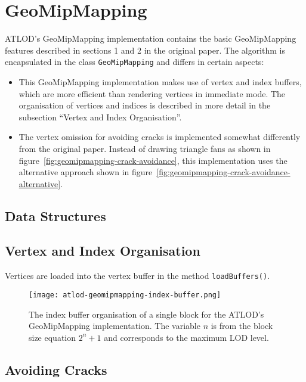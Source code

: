\section{GeoMipMapping}
ATLOD's GeoMipMapping implementation contains the basic GeoMipMapping features 
described in sections 1 and 2 in the original paper. 
The algorithm is encapsulated in the class \texttt{GeoMipMapping} and differs in certain aspects:
\begin{itemize}
  \item This GeoMipMapping implementation makes use of vertex and index buffers, which are more efficient than 
        rendering vertices in immediate mode. The organisation of vertices and indices is described in more detail in the subsection ``Vertex and Index Organisation''.
  \item The vertex omission for avoiding cracks is implemented somewhat differently from the original paper. 
        Instead of drawing triangle fans as shown in figure~\ref{fig:geomipmapping-crack-avoidance}, this implementation 
        uses the alternative approach shown in figure~\ref{fig:geomipmapping-crack-avoidance-alternative}.
\end{itemize}

\subsection{Data Structures}

\subsection{Vertex and Index Organisation}
Vertices are loaded into the vertex buffer in the method \texttt{loadBuffers()}. 

\begin{figure}[H]
  \centering
  \texttt{[image: atlod-geomipmapping-index-buffer.png]}
  \caption{The index buffer organisation of a single block for the ATLOD's GeoMipMapping implementation. The variable $n$ is from the block size equation $2^n + 1$ and corresponds to the maximum LOD level.}\label{fig:atlod-geomipmapping-index-buffers}
\end{figure}

\subsection{Avoiding Cracks}

